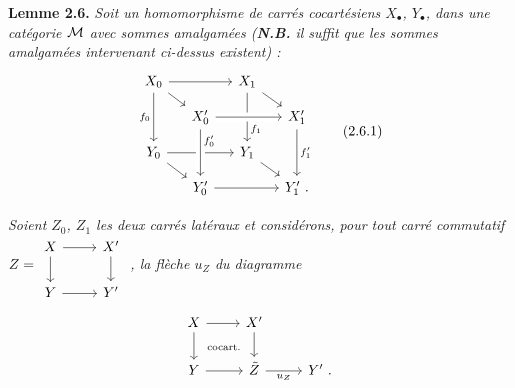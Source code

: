 \textbf{Lemme 2.6.} \textit{Soit un homomorphisme de carrés cocartésiens $X_\bullet$, $Y_\bullet$, dans une catégorie $\mathcal{M}$ avec sommes amalgamées (\textbf{N.B.} il suffit que les sommes amalgamées intervenant ci-dessus existent) :}
\[
\begin{tikzcd}[row sep=small, column sep=small]
X_0 \arrow[rr] \arrow[dr] \arrow[dd, "f_0"'] & & X_1 \arrow[dr] \arrow[dd, "f_1" near end] & \\
 & X'_0 \arrow[rr, crossing over] & & X'_1 \arrow[dd, "f'_1"] \\
Y_0 \arrow[rr] \arrow[dr] & & Y_1 \arrow[dr] & \\
 & Y'_0 \arrow[rr] \arrow[from=uu, crossing over, "f'_0" near start] & & Y'_1 \ .
\end{tikzcd}
\tag*{(2.6.1)}
\]

\textit{Soient $Z_0$, $Z_1$ les deux carrés latéraux et considérons, pour tout carré commutatif}
$Z = \begin{tikzcd}[ampersand replacement=\&, baseline=(\tikzcdmatrixname.center)]
X \arrow[r] \arrow[d] \& X' \arrow[d] \\
Y \arrow[r] \& Y'
\end{tikzcd}$ \textit{, la flèche $u_Z$ du diagramme}
\[
\begin{tikzcd}
X \arrow[r] \arrow[d] \arrow[dr, phantom, "\text{\scriptsize cocart.}"] & X' \arrow[d] & \\
Y \arrow[r] & \tilde{Z} \arrow[r, "u_Z"'] & Y' \ .
\end{tikzcd}
\]



